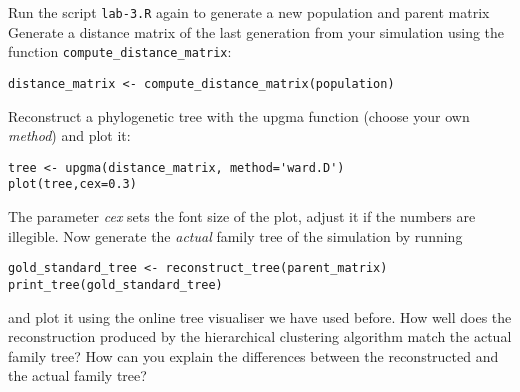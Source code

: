 \documentclass[a4paper, 9pt]{article}
\begin{document}
\begin{exercise}
    \action Run the script \verb|lab-3.R| again to generate a new population and parent matrix
    \action Generate a distance matrix of the last generation from your simulation using the function \verb|compute_distance_matrix|:
    \begin{lstlisting}
distance_matrix <- compute_distance_matrix(population)
    \end{lstlisting}
    \action Reconstruct a phylogenetic tree with the upgma function (choose your own \textit{method}) and plot it:
    \begin{lstlisting}
tree <- upgma(distance_matrix, method='ward.D')
plot(tree,cex=0.3)
    \end{lstlisting}    
    The parameter \textit{cex} sets the font size of the plot, adjust it if the numbers are illegible.
    \action Now generate the \textit{actual} family tree of the simulation by running\begin{lstlisting}
gold_standard_tree <- reconstruct_tree(parent_matrix)
print_tree(gold_standard_tree)
\end{lstlisting} 
and plot it using the online tree visualiser we have used before.
    \ask How well does the reconstruction produced by the hierarchical clustering algorithm match the actual family tree?
    \askstar How can you explain the differences between the reconstructed and the actual family tree?
\end{exercise}
\end{document}
